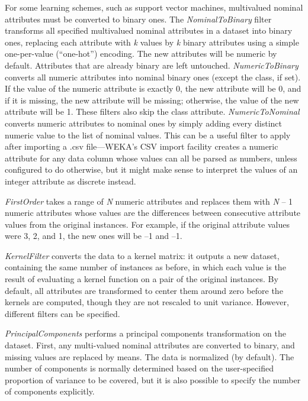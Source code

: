 For some learning schemes, such as support vector machines,
multivalued nominal attributes must be converted to binary ones. The
\textit{NominalToBinary} filter transforms all specified multivalued
nominal attributes in a dataset into binary ones, replacing each
attribute with \textit{k} values by \textit{k} binary attributes using
a simple one-per-value (``one-hot'') encoding. The new attributes will
be numeric by default. Attributes that are already binary are left
untouched. \textit{NumericToBinary} converts all numeric attributes
into nominal binary ones (except the class, if set). If the value of
the numeric attribute is exactly 0, the new attribute will be 0, and
if it is missing, the new attribute will be missing; otherwise, the
value of the new attribute will be 1. These filters also skip the
class attribute. \textit{NumericToNominal} converts numeric attributes
to nominal ones by simply adding every distinct numeric value to the
list of nominal values. This can be a useful filter to apply after
importing a .csv file---WEKA's CSV import facility creates a numeric
attribute for any data column whose values can all be parsed as
numbers, unless configured to do otherwise, but it might make sense to
interpret the values of an integer attribute as discrete instead.

\textit{FirstOrder} takes a range of \textit{N} numeric attributes and
replaces them with \textit{N} -- 1 numeric attributes whose values are the
differences between consecutive attribute values from the original
instances. For example, if the original attribute values were 3, 2,
and 1, the new ones will be --1 and --1.

\textit{KernelFilter} converts the data to a kernel matrix: it outputs
a new dataset, containing the same number of instances as before, in
which each value is the result of evaluating a kernel function on a
pair of the original instances. By default, all attributes are transformed
to center them around zero before the kernels are computed, though
they are not rescaled to unit variance. However, different filters can
be specified.

\textit{PrincipalComponents} performs a principal components
transformation on the dataset. First, any multi-valued nominal
attributes are converted to binary, and missing values are replaced by
means. The data is normalized (by default). The number of components
is normally determined based on the user-specified proportion of
variance to be covered, but it is also possible to specify the number
of components explicitly.

